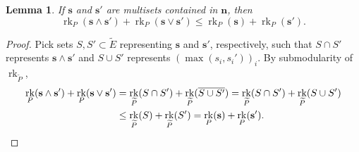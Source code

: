 \documentclass[11pt]{article}
\newtheorem{lemm}[theo]{Lemma}
\theoremstyle{definition}
\numberwithin{equation}{section}
\DeclareMathOperator{\rk}{rk}
\begin{document}
\begin{lemm}\label{submodularity}
  If $\mathbf s$ and $\mathbf s'$ are multisets contained in $\mathbf n$, then
  \[
    \rk_{P}(\mathbf s \wedge \mathbf s') + \rk_{P}(\mathbf s \vee \mathbf s') \leq \rk_{P}(\mathbf s) + \rk_{P}(\mathbf s').
  \]
\end{lemm}
\begin{proof}
  Pick sets $S, S' \subset \widetilde E$ representing $\mathbf s$ and $\mathbf s'$, respectively, such that $S \cap S'$ represents $\mathbf s \wedge \mathbf s'$ and $S \cup S'$ represents $(\max(s_i, s_i'))_i$.
  By submodularity of $\rk_{\widetilde P}$,
  \begin{align*}
    \rk_{P}(\mathbf s \wedge \mathbf s') + \rk_{P}(\mathbf s \vee \mathbf s')
    &= \rk_{\widetilde P}(S \cap S') + \rk_{\widetilde P}(\overline{S \cup S'})
    = \rk_{\widetilde P}(S \cap S') + \rk_{\widetilde P}(S \cup S')\\
    &\leq \rk_{\widetilde P}(S) + \rk_{\widetilde P}(S')
    = \rk_{P}(\mathbf s) + \rk_{P}(\mathbf s'). \qedhere
  \end{align*}
\end{proof}
\end{document}
